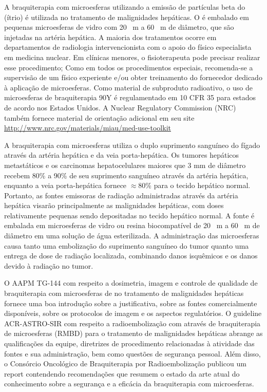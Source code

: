 \documentclass[11pt,a4paper]{article}
\begin{document}
    A braquiterapia com microesferas utilizando a emissão de partículas beta do  (ítrio) é utilizada no tratamento de malignidades hepáticas. O  é embalado em pequenas microesferas de vidro com 20 \unit{\mu m} a 60 \unit{\mu m} de diâmetro, que são injetadas na artéria hepática. A maioria dos tratamentos ocorre em departamentos de radiologia intervencionista com o apoio do físico especialista em medicina nuclear. Em clínicas menores, o fisioterapeuta pode precisar realizar esse procedimento; Como em todos os procedimentos especiais, recomenda-se a supervisão de um físico experiente e/ou obter treinamento do fornecedor dedicado à aplicação de microesferas. Como material de subproduto radioativo, o uso de microesferas de braquiterapia 90Y é regulamentado em 10 CFR 35 para estados de acordo nos Estados Unidos. A Nuclear Regulatory Commission (NRC) também fornece material de orientação adicional em seu site \href{http://www.nrc.gov/materials/miau/med-use-toolkit.html#other}{http://www.nrc.gov/materials/miau/med-use-toolkit}

    A braquiterapia com microesferas utiliza o duplo suprimento sanguíneo do fígado através da artéria hepática e da veia porta-hepática. Os tumores hepáticos metastáticos e os carcinomas hepatocelulares maiores que 3 mm de diâmetro recebem 80\% a 90\% de seu suprimento sanguíneo através da artéria hepática, enquanto a veia porta-hepática fornece $\approx$80\% para o tecido hepático normal. Portanto, as fontes emissoras de radiação administradas através da artéria hepática visarão principalmente as malignidades hepáticas, com doses relativamente pequenas sendo depositadas no tecido hepático normal. A fonte  é embalada em microesferas de vidro ou resina biocompatível de 20 \unit{\mu m} a 60 \unit{\mu m} de diâmetro em uma solução de água esterilizada. A administração das microesferas causa tanto uma embolização do suprimento sanguíneo do tumor quanto uma entrega de dose de radiação localizada, combinando danos isquêmicos e os danos devido à radiação no tumor.

    O AAPM TG-144 com respeito a dosimetria, imagem e controle de qualidade de braquiterapia com microesferas de  no tratamento de malignidades hepáticas fornece uma boa introdução sobre a justificativa, sobre as fontes comercialmente disponíveis, sobre os protocolos de imagem e os aspectos regulatórios. O guideline ACR-ASTRO-SIR com respeito a radioembolização com através de braquiterapia de microesferas (RMBD) para o tratamento de malignidades hepáticas abrange as qualificações da equipe, diretrizes de procedimento relacionadas à atividade das fontes e sua administração, bem como questões de segurança pessoal. Além disso, o Consórcio Oncológico de Braquiterapia por Radioembolização publicou um report contendendo recomendações que resumem o estado da arte atual do conhecimento sobre a segurança e a eficácia da braquiterapia com microesferas.
\end{document}
